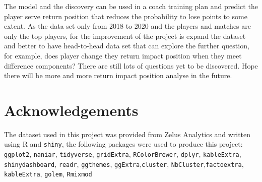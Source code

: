 \documentclass[11pt,a4paper,]{article}
\begin{document}
The model and the discovery can be used in a coach training plan and predict the player serve return position that reduces the probability to lose points to some extent. As the data set only from 2018 to 2020 and the players and matches are only the top players, for the improvement of the project is expand the dataset and better to have head-to-head data set that can explore the further question, for example, does player change they return impact position when they meet difference components? There are still lots of questions yet to be discovered. Hope there will be more and more return impact position analyse in the future.

\hypertarget{acknowledgements}{%
\section{Acknowledgements}\label{acknowledgements}}

The dataset used in this project was provided from Zelus Analytics and written using R and \texttt{shiny}\autocite{shin}, the following packages were used to produce this project: \texttt{ggplot2}\autocite{Springer}, \texttt{naniar}\autocite{naria}, \texttt{tidyverse}\autocite{tidyverse}, \texttt{gridExtra}\autocite{grid}, \texttt{RColorBrewer}\autocite{rcolor}, \texttt{dplyr}\autocite{dply}, \texttt{kableExtra}\autocite{kable}, \texttt{shinydashboard}\autocite{dash}, \texttt{readr}\autocite{readr}, \texttt{ggthemes}\autocite{gthe}, \texttt{ggExtra}\autocite{gextra},\texttt{cluster}\autocite{cluster}, \texttt{NbCluster}\autocite{nclus},\texttt{factoextra}\autocite{fact}, \texttt{kableExtra}\autocite{kextra}, \texttt{golem}\autocite{gol}, \texttt{Rmixmod}\autocite{mod}

\clearpage

\printbibliography
\end{document}
